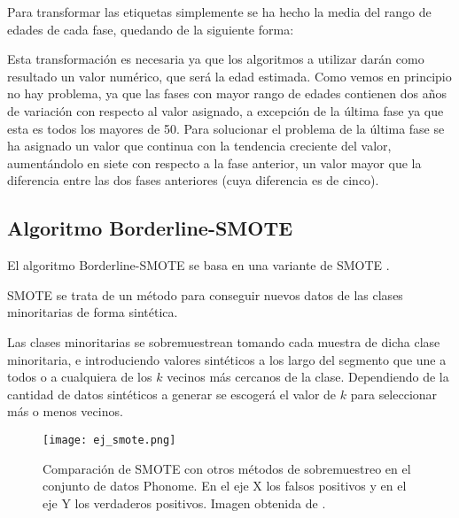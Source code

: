 Para transformar las etiquetas simplemente se ha hecho la media del rango de edades de cada fase, quedando de la siguiente forma:


\begin{table}[H]
\centering
{}
\end{table}

Esta transformación es necesaria ya que los algoritmos a utilizar darán como resultado un valor numérico, que será la edad estimada. Como vemos en principio no hay problema, ya que las fases con mayor rango de edades contienen dos años de variación con respecto al valor asignado, a excepción de la última fase ya que esta es todos los mayores de 50. Para solucionar el problema de la última fase se ha asignado un valor que continua con la tendencia creciente del valor, aumentándolo en siete con respecto a la fase anterior, un valor mayor que la diferencia entre las dos fases anteriores (cuya diferencia es de cinco).

\subsection{Algoritmo Borderline-SMOTE}

El algoritmo Borderline-SMOTE \cite{BL-SMOTE} se basa en una variante de SMOTE \cite{SMOTE}.

SMOTE se trata de un método para conseguir nuevos datos de las clases minoritarias de forma sintética.

Las clases minoritarias se sobremuestrean tomando cada muestra de dicha clase minoritaria, e introduciendo valores sintéticos a los largo del segmento que une a todos o a cualquiera de los $k$ vecinos más cercanos de la clase. Dependiendo de la cantidad de datos sintéticos a generar se escogerá el valor de $k$ para seleccionar más o menos vecinos.


\begin{figure}[H]
	\centering
	\texttt{[image: ej\_smote.png]}
	\caption{Comparación de SMOTE con otros métodos de sobremuestreo en el conjunto de datos Phonome. En el eje X los falsos positivos y en el eje Y los verdaderos positivos. Imagen obtenida de \cite{SMOTE}.}
	\label{fig:comparacionSMOTE}
\end{figure}

